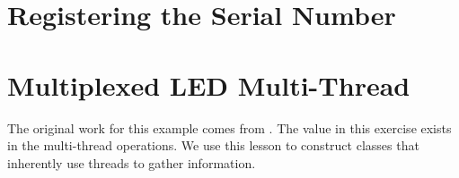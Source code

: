 \documentclass{article}
\begin{document}


\section{Registering the Serial Number} %




\section{Multiplexed LED Multi-Thread} %
\label{sec:multiplexed_led_multi_thread}

The original work for this example comes from \cite{Ibrahim-ARM-based-Microcontrollers}.  The value in this exercise exists in the multi-thread operations.   We use this lesson to construct classes that inherently use threads to gather information.

\end{document}
